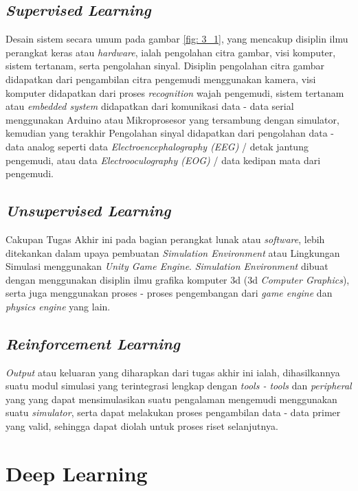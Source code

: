 \subsection{\textit{Supervised Learning}}
Desain sistem secara umum pada gambar \ref{fig: 3_1}, yang mencakup disiplin ilmu perangkat keras atau \textit{hardware}, ialah pengolahan citra gambar, visi komputer, sistem tertanam, serta pengolahan sinyal. Disiplin pengolahan citra gambar didapatkan dari pengambilan citra pengemudi menggunakan kamera, visi komputer didapatkan dari proses \textit{recognition} wajah pengemudi, sistem tertanam atau \textit{embedded system} didapatkan dari komunikasi data - data serial menggunakan Arduino atau Mikroprosesor yang tersambung dengan simulator, kemudian yang terakhir Pengolahan sinyal didapatkan dari pengolahan data - data analog seperti data \textit{Electroencephalography (EEG)} / detak jantung pengemudi, atau data \textit{Electrooculography (EOG)} / data kedipan mata dari pengemudi.
\vspace{1ex}

\subsection{\textit{Unsupervised Learning}}
Cakupan Tugas Akhir ini pada bagian perangkat lunak atau \textit{software}, lebih ditekankan dalam upaya pembuatan \textit{Simulation Environment} atau Lingkungan Simulasi menggunakan \textit{Unity Game Engine}. \textit{Simulation Environment} dibuat dengan menggunakan disiplin ilmu grafika komputer 3d (3d \textit{Computer Graphics}), serta juga menggunakan proses - proses pengembangan dari \textit{game engine} dan \textit{physics engine} yang lain.
\vspace{1ex}

\subsection{\textit{Reinforcement Learning}}
\textit{Output} atau keluaran yang diharapkan dari tugas akhir ini ialah, dihasilkannya suatu modul simulasi yang terintegrasi lengkap dengan \textit{tools - tools} dan \textit{peripheral} yang yang dapat mensimulasikan suatu pengalaman mengemudi menggunakan suatu \textit{simulator}, serta dapat melakukan proses pengambilan data - data primer yang valid, sehingga dapat diolah untuk proses riset selanjutnya.
\vspace{1ex}

\section{Deep Learning}
\vspace{1ex}

